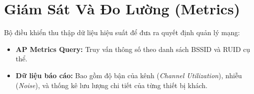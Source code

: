 \section{Giám Sát Và Đo Lường (Metrics)}
Bộ điều khiển thu thập dữ liệu hiệu suất để đưa ra quyết định quản lý mạng:
\begin{itemize}
	\item \textbf{AP Metrics Query:} Truy vấn thông số theo danh sách BSSID và RUID cụ thể.
	\item \textbf{Dữ liệu báo cáo:} Bao gồm độ bận của kênh (\textit{Channel Utilization}), nhiễu (\textit{Noise}), và thống kê lưu lượng chi tiết của từng thiết bị khách.
\end{itemize}

